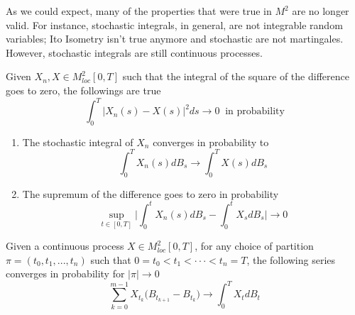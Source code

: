 As we could expect, many of the properties that were true in $M^2$ are no longer valid. For instance, stochastic integrals, in general, are not integrable random variables; Ito Isometry isn't true anymore and stochastic are not martingales. However, stochastic integrals are still continuous processes. 

\begin{proposition}
    Given $X_n, X \in M^2_{loc}[0,T]$ such that the integral of the square of the difference goes to zero, the followings are true
    \begin{equation*}
        \int_0^T \big\vert X_n(s) - X(s) \big\vert^2 ds \to 0 \;\; \text{in probability}
    \end{equation*}
    \begin{enumerate}
        \item The stochastic integral of $X_n$ converges in probability to 
        \begin{equation*}
            \int_0^T X_n (s) dB_s \to \int_0^T X(s) dB_s
        \end{equation*}
        \item The supremum of the difference goes to zero in probability
        \begin{equation*}
            \sup_{t \in [0,T]} \Bigg\vert \int_0^t X_n(s) dB_s - \int_0^t X_s dB_s \Bigg\vert \to 0 
        \end{equation*}
    \end{enumerate}
\end{proposition}
\begin{corollary}
    Given a continuous process $X \in M^2_{loc}[0,T]$, for any choice of partition $\pi = (t_0,t_1,...,t_n)$ such that $0 = t_0 < t_1 < \cdot\cdot\cdot < t_n = T$, the following series converges in probability for $\vert \pi\vert \to 0 $ 
    \begin{equation*}
        \sum_{k=0}^{m-1} X_{t_k}\big( B_{t_{k+1}}-B_{t_k} \big) \to \int_0^T X_{t} dB_t
    \end{equation*}
\end{corollary}
